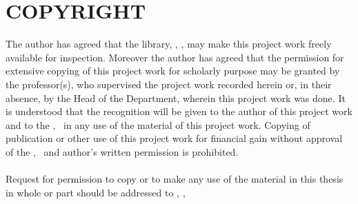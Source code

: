 \section*{COPYRIGHT}

The author has agreed that the library, \thedepartment, \thecampus, may make this project
work freely available for inspection. Moreover the author has agreed that the
permission for extensive copying of this project work for scholarly purpose may be
granted by the professor(s), who supervised the project work recorded herein or, in
their absence, by the Head of the Department, wherein this project work was done. It
is understood that the recognition will be given to the author of this project work and
to the \thedepartment, \thecampus \ in any use of the material of this project work. Copying of publication or other use of
this project work for financial gain without approval of the \thedepartment, \thecampus \ and author's
written permission is prohibited.\\
\\
Request for permission to copy or to make any use of the material in this thesis in
whole or part should be addressed to \thedepartment, \thecampus, \thedepartmentFullAddress

